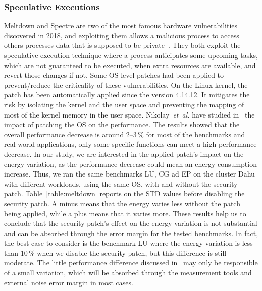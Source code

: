 \subsubsection{Speculative Executions}
Meltdown and Spectre are two of the most famous hardware vulnerabilities discovered in 2018, and exploiting them allows a malicious process to access others processes data that is supposed to be private~\cite{Kocher2018spectre,Lipp2018meltdown}.
They both exploit the speculative execution technique where a process anticipates some upcoming tasks, which are not guaranteed to be executed, when extra resources are available, and revert those changes if not.
Some OS-level patches had been applied to prevent/reduce the criticality of these vulnerabilities.
On the Linux kernel, the patch has been automatically applied since the version 4.14.12.
It mitigates the risk by isolating the kernel and the user space and preventing the mapping of most of the kernel memory in the user space.
Nikolay~\emph{et~al.} have studied in~\cite{DBLP:journals/corr/abs-1801-04329} the impact of patching the OS on the performance.
The results showed that the overall performance decrease is around 2--3\,\% for most of the benchmarks and real-world applications, only some specific functions can meet a high performance decrease.
In our study, we are interested in the applied patch's impact on the energy variation, as the performance decrease could mean an energy consumption increase.
Thus, we ran the same benchmarks \textsf{LU}, \textsf{CG} ad \textsf{EP} on the cluster \textsf{Dahu} with different workloads, using the same OS, with and without the security patch.
Table~\ref{table:meltdown} reports on the STD values before disabling the security patch.
A minus means that the energy varies less without the patch being applied, while a plus means that it varies more.
These results help us to conclude that the security patch's effect on the energy variation is not substantial and can be absorbed through the error margin for the tested benchmarks.
In fact, the best case to consider is the benchmark \textsf{LU} where the energy variation is less than 10\,\% when we disable the security patch, but this difference is still moderate.
The little performance difference discussed in~\cite{Kocher2018spectre,Lipp2018meltdown} may only be responsible of a small variation, which will be absorbed through the measurement tools and external noise error margin in most cases.

